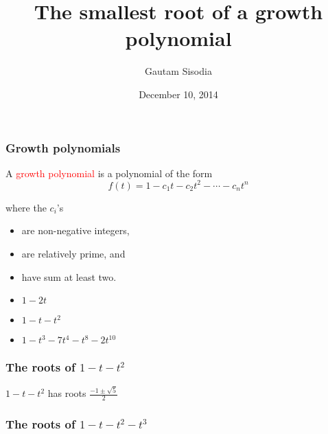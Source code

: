 \documentclass{beamer}
\title[The smallest root of a growth polynomial]{The smallest root of a growth polynomial}
\author[Sisodia]{Gautam Sisodia}
\date{December 10, 2014}
\begin{document}
\begin{frame}
\titlepage

\end{frame}


\begin{frame}
\frametitle{Growth polynomials}

A \textcolor{red}{growth polynomial} is a polynomial of the form
$$
f(t) = 1 - c_1 t - c_2 t^2 - \cdots - c_n t^n
$$

\pause

where the $c_i$'s
\begin{itemize}
\item are non-negative integers,
\pause
\item are relatively prime, and
\pause
\item have sum at least two. 
\end{itemize}

\pause

\hfil

\begin{ex}
\begin{itemize}
\item $1-2t$
\pause
\item $1-t-t^2$ 
\pause
\item $1-t^3-7t^4-t^8-2t^{10}$
\end{itemize}
\end{ex}

\end{frame}

\begin{frame}
\frametitle{The roots of $1-t-t^2$}

$1-t-t^2$ has roots $\frac{-1 \pm \sqrt{5}}{2}$

\pause

\begin{figure}[h]
\centering
\makebox[\textwidth][c]{\texttt{[image: 11]}}
\end{figure}


\end{frame}

\begin{frame}
\frametitle{The roots of $1-t-t^2-t^3$}

\begin{figure}[h]
\centering
\makebox[\textwidth][c]{\texttt{[image: 111]}}
\end{figure}


\end{frame}
\end{document}
